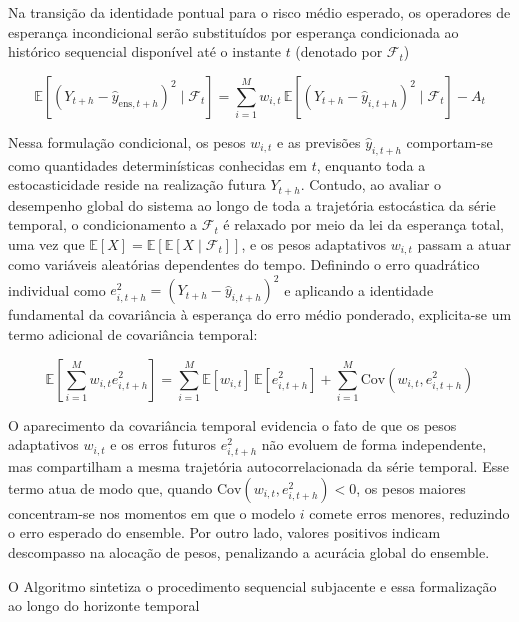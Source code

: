 Na transição da identidade pontual para o risco médio esperado, os operadores de esperança incondicional serão substituídos por esperança condicionada ao histórico sequencial disponível até o instante $t$ (denotado por $\mathcal{F}_t$)

$$\mathbb{E}\left[(Y_{t+h} - \hat{y}_{\text{ens}, t+h})^2 \mid \mathcal{F}_t\right] = \sum_{i=1}^{M} w_{i,t} \, \mathbb{E}\left[(Y_{t+h} - \hat{y}_{i, t+h})^2 \mid \mathcal{F}_t\right] - A_t$$


Nessa formulação condicional, os pesos $w_{i,t}$ e as previsões $\hat{y}_{i,t+h}$ comportam-se como quantidades determinísticas conhecidas em $t$, enquanto toda a estocasticidade reside na realização futura $Y_{t+h}$. Contudo, ao avaliar o desempenho global do sistema ao longo de toda a trajetória estocástica da série temporal, o condicionamento a $\mathcal{F}_t$ é relaxado por meio da lei da esperança total, uma vez que $\mathbb{E}[X] = \mathbb{E}[\mathbb{E}[X \mid \mathcal{F}_t]]$, e os pesos adaptativos $w_{i,t}$ passam a atuar como variáveis aleatórias dependentes do tempo. Definindo o erro quadrático individual como $e_{i,t+h}^2 = (Y_{t+h} - \hat{y}_{i,t+h})^2$ e aplicando a identidade fundamental da covariância à esperança do erro médio ponderado, explicita-se um termo adicional de covariância temporal:

$$\mathbb{E}\left[\sum_{i=1}^{M} w_{i,t} e_{i, t+h}^2\right] = \sum_{i=1}^{M} \mathbb{E}[w_{i,t}] \, \mathbb{E}[e_{i, t+h}^2] + \sum_{i=1}^{M} \text{Cov}(w_{i,t}, e_{i, t+h}^2)$$

O aparecimento da covariância temporal evidencia o fato de que os pesos adaptativos $w_{i,t}$ e os erros futuros $e_{i,t+h}^2$ não evoluem de forma independente, mas compartilham a mesma trajetória autocorrelacionada da série temporal. Esse termo atua de modo que, quando $\mathrm{Cov}(w_{i,t}, e_{i,t+h}^2) < 0$, os pesos maiores concentram-se nos momentos em que o modelo $i$ comete erros menores, reduzindo o erro esperado do ensemble. Por outro lado, valores positivos indicam descompasso na alocação de pesos, penalizando a acurácia global do ensemble.

O Algoritmo sintetiza o procedimento sequencial subjacente e essa formalização ao longo do horizonte temporal

